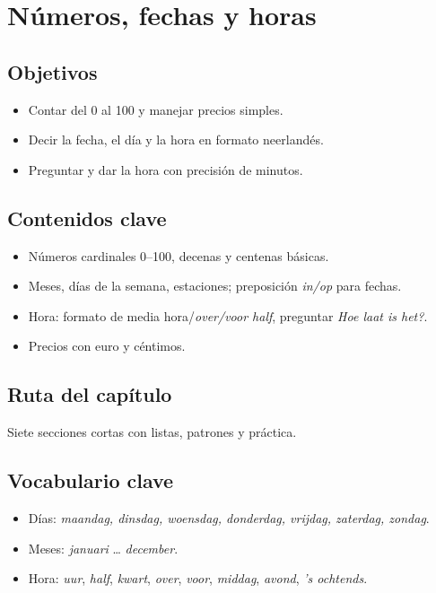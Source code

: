 \chapter{Números, fechas y horas}
\section{Objetivos}
\begin{itemize}[leftmargin=*]
	\item Contar del 0 al 100 y manejar precios simples.
	\item Decir la fecha, el día y la hora en formato neerlandés.
	\item Preguntar y dar la hora con precisión de minutos.
\end{itemize}

\section{Contenidos clave}
\begin{itemize}[leftmargin=*]
	\item Números cardinales 0--100, decenas y centenas básicas.
	\item Meses, días de la semana, estaciones; preposición \textit{in/op} para fechas.
	\item Hora: formato de media hora/\textit{over/voor half}, preguntar \textit{Hoe laat is het?}.
	\item Precios con euro y céntimos.
\end{itemize}

\section{Ruta del capítulo}
Siete secciones cortas con listas, patrones y práctica.









\section{Vocabulario clave}
\begin{itemize}[leftmargin=*]
	\item Días: \textit{maandag, dinsdag, woensdag, donderdag, vrijdag, zaterdag, zondag}.
	\item Meses: \textit{januari} \ldots{} \textit{december}.
	\item Hora: \textit{uur}, \textit{half}, \textit{kwart}, \textit{over}, \textit{voor}, \textit{middag}, \textit{avond}, \textit{'s ochtends}.
\end{itemize}

